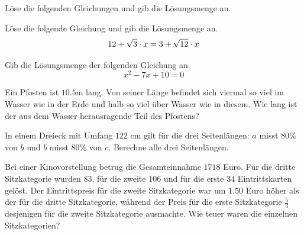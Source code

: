 \documentclass[11pt]{exam}
\begin{document}
\begin{questions}

\question[8] %
Löse die folgenden Gleichungen und gib die Lösungsmenge an.

\question[3]
Löse die folgende Gleichung und gib die Lösungsmenge an. \[12+\sqrt{3}\cdot x=3+\sqrt{12}\cdot x\]

\question[3]
Gib die Lösungsmenge der folgenden Gleichung an. \[x^2-7x+10=0\]


\question[5] %
Ein Pfosten ist $10.5$m lang. Von seiner Länge befindet sich viermal so viel im Wasser wie in der Erde und halb so viel über Wasser wie in diesem. Wie lang ist der aus dem Wasser herausragende Teil des Pfostens?

\question[5] %
In einem Dreieck mit Umfang $122$ cm gilt für die drei Seitenlängen: $a$ misst $80\%$ von $b$ und $b$ misst $80\%$ von $c$. Berechne alle drei Seitenlängen.

\question[5] %
Bei einer Kinovorstellung betrug die Gesamteinnahme $1718$ Euro. Für die dritte Sitzkategorie wurden $83$, für die zweite $106$ und für die erste $34$ Eintrittskarten gelöst. Der Eintrittspreis für die zweite Sitzkategorie war um $1.50$ Euro höher als der für die dritte Sitzkategorie, während der Preis für die erste Sitzkategorie $\frac{5}{3}$ desjenigen für die zweite Sitzkategorie ausmachte.
Wie teuer waren die einzelnen Sitzkategorien?


\end{questions}
\end{document}
